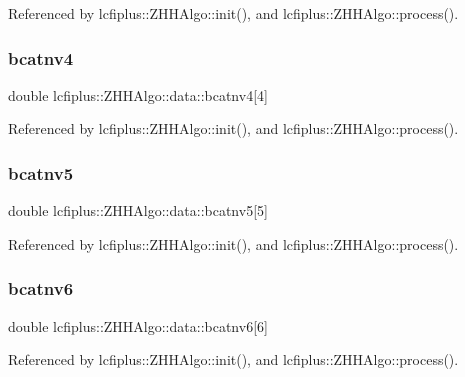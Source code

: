 Referenced by lcfiplus\+::\+Z\+H\+H\+Algo\+::init(), and lcfiplus\+::\+Z\+H\+H\+Algo\+::process().

\mbox{\label{structlcfiplus_1_1ZHHAlgo_1_1data_aab0f82f6feba9621b6430c2792e3a2bd}} 
\subsubsection{bcatnv4}
{\footnotesize\ttfamily double lcfiplus\+::\+Z\+H\+H\+Algo\+::data\+::bcatnv4[4]}



Referenced by lcfiplus\+::\+Z\+H\+H\+Algo\+::init(), and lcfiplus\+::\+Z\+H\+H\+Algo\+::process().

\mbox{\label{structlcfiplus_1_1ZHHAlgo_1_1data_a1422b826684ab2389e3c66dd9b1db2ae}} 
\subsubsection{bcatnv5}
{\footnotesize\ttfamily double lcfiplus\+::\+Z\+H\+H\+Algo\+::data\+::bcatnv5[5]}



Referenced by lcfiplus\+::\+Z\+H\+H\+Algo\+::init(), and lcfiplus\+::\+Z\+H\+H\+Algo\+::process().

\mbox{\label{structlcfiplus_1_1ZHHAlgo_1_1data_a1b4f9cd407838fa2f9cf49bd888229e7}} 
\subsubsection{bcatnv6}
{\footnotesize\ttfamily double lcfiplus\+::\+Z\+H\+H\+Algo\+::data\+::bcatnv6[6]}



Referenced by lcfiplus\+::\+Z\+H\+H\+Algo\+::init(), and lcfiplus\+::\+Z\+H\+H\+Algo\+::process().

\mbox{\label{structlcfiplus_1_1ZHHAlgo_1_1data_a76d8efe0df1cb9209fbae52e43db4253}} 
